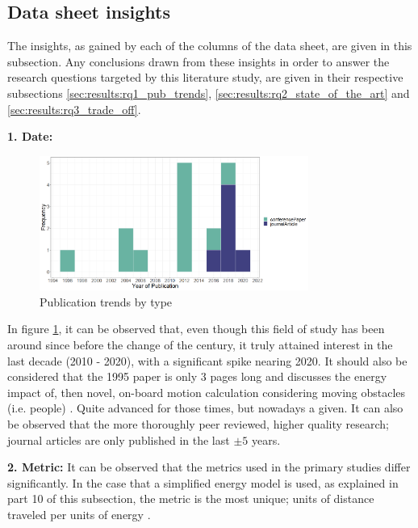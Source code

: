 
\subsection{Data sheet insights}
\label{sec:results:insights}
The insights, as gained by each of the columns of the data sheet, are given in this subsection.
Any conclusions drawn from these insights in order to answer the research questions targeted by this literature study,
are given in their respective subsections \ref{sec:results:rq1_pub_trends}, \ref{sec:results:rq2_state_of_the_art} and \ref{sec:results:rq3_trade_off}.

\vspace{2mm}

\noindent\textbf{1. Date:}
\begin{figure}[t]
    \includegraphics[width=250pt]{figures/publication_trend_extended.png}
    \caption{Publication trends by type}
    \label{fig:pub_trends}
\end{figure}
In figure \ref{fig:pub_trends}, it can be observed that, even though this field of study has been around since before the change of the century,
it truly attained interest in the last decade (2010 - 2020), with a significant spike nearing 2020.
It should also be considered that the 1995 paper is only 3 pages long and discusses the energy impact
of, then novel, on-board motion calculation considering moving obstacles (i.e. people) \cite{barili1995efficient_motion}.
Quite advanced for those times, but nowadays a given.
It can also be observed that the more thoroughly peer reviewed, higher quality research; journal articles are only published in the last $\pm 5$ years.

\vspace{2mm}

\noindent\textbf{2. Metric:} %
It can be observed that the metrics used in the primary studies differ significantly.
In the case that a simplified energy model is used, as explained in part 10 of this subsection, the metric is the most unique;
units of distance traveled per units of energy \cite{mei2006mobile_exploration, patel2012exploration_strategy}.

